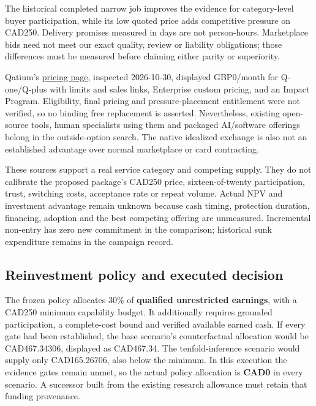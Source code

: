 \documentclass[
  11pt,
]{article}
\begin{document}
The historical completed narrow job improves the evidence for
category-level buyer participation, while its low quoted price adds
competitive pressure on CAD250. Delivery promises measured in days are
not person-hours. Marketplace bids need not meet our exact quality,
review or liability obligations; those differences must be measured
before claiming either parity or superiority.

Qatium's \href{https://qatium.com/pricing/}{pricing page}, inspected
2026-10-30, displayed GBP0/month for Q-one/Q-plus with limits and sales
links, Enterprise custom pricing, and an Impact Program. Eligibility,
final pricing and pressure-placement entitlement were not verified, so
no binding free replacement is asserted. Nevertheless, existing
open-source tools, human specialists using them and packaged AI/software
offerings belong in the outside-option search. The native idealized
exchange is also not an established advantage over normal marketplace or
card contracting.

These sources support a real service category and competing supply. They
do not calibrate the proposed package's CAD250 price, sixteen-of-twenty
participation, trust, switching costs, acceptance rate or repeat volume.
Actual NPV and investment advantage remain unknown because cash timing,
protection duration, financing, adoption and the best competing offering
are unmeasured. Incremental non-entry has zero new commitment in the
comparison; historical sunk expenditure remains in the campaign record.

\hypertarget{reinvestment-policy-and-executed-decision}{%
\subsection{Reinvestment policy and executed
decision}\label{reinvestment-policy-and-executed-decision}}

The frozen policy allocates 30\% of \textbf{qualified unrestricted
earnings}, with a CAD250 minimum capability budget. It additionally
requires grounded participation, a complete-cost bound and verified
available earned cash. If every gate had been established, the base
scenario's counterfactual allocation would be CAD467.34306, displayed as
CAD467.34. The tenfold-inference scenario would supply only
CAD165.26706, also below the minimum. In this execution the evidence
gates remain unmet, so the actual policy allocation is \textbf{CAD0} in
every scenario. A successor built from the existing research allowance
must retain that funding provenance.
\end{document}
